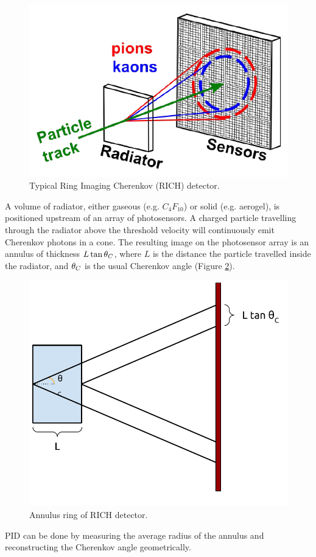 \begin{figure}[ht]
	\centering
	\includegraphics[scale=1]{figures/RICH.pdf}
	\caption{Typical Ring Imaging Cherenkov (RICH) detector.}
	\label{fig:richbasics}
\end{figure}
A volume of radiator, either gaseous (e.g. $C_{4}F_{10}$) or solid (e.g. aerogel), is positioned upstream of an array of photosensors. A charged particle travelling through the radiator above the threshold velocity will continuously emit Cherenkov photons in a cone. The resulting image on the photosensor array is an annulus of thickness $L\tan\theta_{C}$, where $L$ is the distance the particle travelled inside the radiator, and  $\theta_{C}$ is the usual Cherenkov angle (Figure \ref{fig:richannulus}).
\begin{figure}[ht]
	\centering
	\includegraphics[scale=0.75]{figures/RICH_annulus.pdf}
	\caption{Annulus ring of RICH detector.}
	\label{fig:richannulus}
\end{figure}
PID can be done by measuring the average radius of the annulus and reconstructing the Cherenkov angle geometrically.


